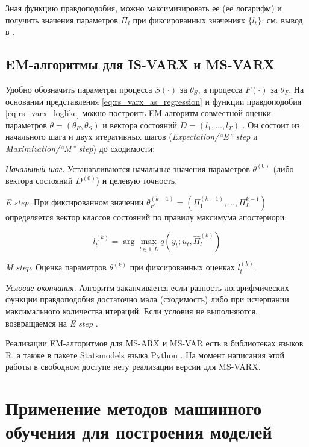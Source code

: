 \documentclass[a4paper,14pt]{extreport}
\begin{document}
Зная функцию правдоподобия, можно максимизировать ее (ее логарифм) и получить значения параметров $\Pi_l$ при фиксированных значениях $\{l_t\}$; см. вывод в \cite{malNovopMSVARX}.


\section{EM-алгоритмы для IS-VARX и MS-VARX}

Удобно обозначить параметры процесса $S(\cdot)$ за $\theta_S$, а процесса $F(\cdot)$ за $\theta_F$. На основании представления \ref{eq:rs_varx_as_regression} и функции правдоподобия \ref{eq:rs_varx_loglike} можно построить EM-алгоритм совместной оценки параметров $\theta = (\theta_F, \theta_S)$ и вектора состояний $D = (l_1, \dots, l_T)$ \cite{malNovopMSVARX}. Он состоит из начального шага и двух итеративных шагов (\textit{Expectation/``E''  step} и \textit{Maximization/``M'' step}) до сходимости:

\textit{Начальный шаг}. Устанавливаются начальные значения параметров $\theta^{(0)}$ (либо вектора состояний $D^{(0)}$) и целевую точность.

\textit{E step}. При фиксированном значении $\theta_F^{(k-1)}  = (\Pi_1^{(k-1)}, \dots, \Pi_L^{k-1})$ определяется вектор классов состояний по правилу максимума апостериори: 

\begin{equation}
	l_t^{(k)} = \arg\max_{l\in\overline{1,L}}
	q(y_t; u_t, \hat{\Pi}_{l}^{(k)})
\end{equation}

\textit{M step}. Оценка параметров $\theta^{(k)}$ при фиксированных оценках $l_t^{(k)}$.

\textit{Условие окончания}. Алгоритм заканчивается если разность логарифмических функции правдоподобия достаточно мала (сходимость) либо при исчерпании максимального количества итераций. Если условия не выполняются, возвращаемся на \textit{E step} \cite{malNovopMSVARX,malVARforCycles}.

Реализации EM-алгоритмов для MS-ARX и MS-VAR есть в библиотеках языков R, а также в пакете Statsmodels языка Python \cite{statsmodels}. На момент написания этой работы в свободном доступе нету реализации версии для MS-VARX.


\chapter{Применение методов машинного обучения для построения моделей}
\end{document}
